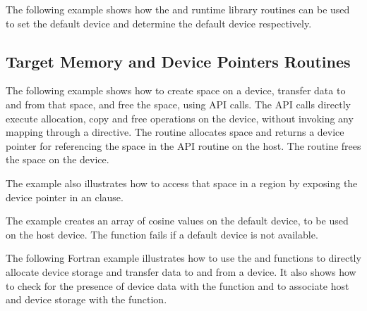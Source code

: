 The following example shows how the  and  
runtime library routines can be used to set the default device and determine the 
default device respectively.






\subsection{Target Memory and Device Pointers Routines}
\label{subsec:target_mem_and_device_ptrs}

The following example shows how to create space on a device, transfer data
to and from that space, and free the space, using API calls. The API calls
directly execute allocation, copy and free operations on the device, without invoking
any mapping through a  directive. The  routine allocates space
and returns a device pointer for referencing the space in the 
API routine on the host. The  routine frees the space on the device.

The example also illustrates how to access that space
in a  region by exposing the device pointer in an  clause.

The example creates an array of cosine values on the default device, to be used
on the host device. The function fails if a default device is not available.


The following Fortran example illustrates how to use the 
and  functions to directly allocate device
storage and transfer data to and from a device. It also shows how to check for
the presence of device data with the  function and
to associate host and device storage with the  function.

